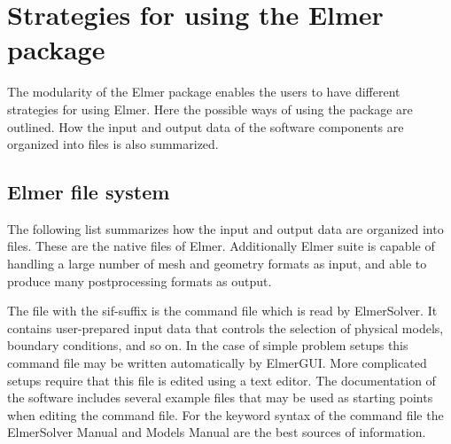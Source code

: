 


\section{Strategies for using the Elmer package}

The modularity of the Elmer package enables the users to have different strategies 
for using Elmer. 
%
%
Here the possible ways of using
the package are outlined. How the input and output data of the software components
are organized into files is also summarized.



\subsection{Elmer file system}

The following list summarizes how the input and output data are organized into files.
These are the native files of Elmer. Additionally Elmer suite is capable of handling a large 
number of mesh and geometry formats as input, and able to produce many postprocessing formats
as output.


\sifbegin
{}
The file with the sif-suffix is the command file which is read by ElmerSolver.
It contains user-prepared input data that controls the selection of physical models,
boundary conditions, and so on. In the case of simple problem setups this command file 
may be written automatically by ElmerGUI. More complicated setups require that this 
file is edited using a text editor. The documentation of the software includes several
example files that may be used as starting points when editing the command file.
For the keyword syntax of the command file
the ElmerSolver Manual and Models Manual are the best sources of information.

